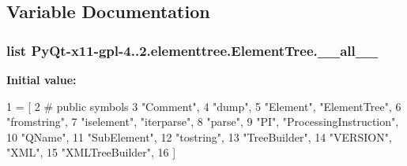 \subsection{Variable Documentation}
\hypertarget{namespacePyQt-x11-gpl-4_811_82_1_1elementtree_1_1ElementTree_ad8cd84242cec6f65061963a8bcc2ce48}{}
\subsubsection[{\+\_\+\+\_\+all\+\_\+\+\_\+}]{\setlength{\rightskip}{0pt plus 5cm}list Py\+Qt-\/x11-\/gpl-\/4..\+2.elementtree.\+Element\+Tree.\+\_\+\+\_\+all\+\_\+\+\_\+}\label{namespacePyQt-x11-gpl-4_811_82_1_1elementtree_1_1ElementTree_ad8cd84242cec6f65061963a8bcc2ce48}
{\bfseries Initial value\+:}
\begin{DoxyCode}
1 = [
2     \textcolor{comment}{# public symbols}
3     \textcolor{stringliteral}{"Comment"},
4     \textcolor{stringliteral}{"dump"},
5     \textcolor{stringliteral}{"Element"}, \textcolor{stringliteral}{"ElementTree"},
6     \textcolor{stringliteral}{"fromstring"},
7     \textcolor{stringliteral}{"iselement"}, \textcolor{stringliteral}{"iterparse"},
8     \textcolor{stringliteral}{"parse"},
9     \textcolor{stringliteral}{"PI"}, \textcolor{stringliteral}{"ProcessingInstruction"},
10     \textcolor{stringliteral}{"QName"},
11     \textcolor{stringliteral}{"SubElement"},
12     \textcolor{stringliteral}{"tostring"},
13     \textcolor{stringliteral}{"TreeBuilder"},
14     \textcolor{stringliteral}{"VERSION"}, \textcolor{stringliteral}{"XML"},
15     \textcolor{stringliteral}{"XMLTreeBuilder"},
16     ]
\end{DoxyCode}
\hypertarget{namespacePyQt-x11-gpl-4_811_82_1_1elementtree_1_1ElementTree_abd18170428926afb1f3e22a622cdc9e1}{}
